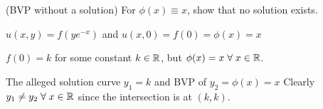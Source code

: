 (BVP without a solution) For $\phi(x) \equiv x$, show that no solution exists. 

\soln* 
$u(x, y) = f(ye^{-x})$ and $u(x, 0) = f(0) = \phi(x) = x$

\nl $f(0) = k$ for some constant $k \in \mathbb{R}$, but $\phi(x) = x \; \forall \; x \in \mathbb{R}$.

\nl The alleged solution curve $y_1 = k$ and BVP of $y_2 = \phi(x) = x$ Clearly $y_1 \neq y_2 \; \forall \; x \in \mathbb{R}$ since the intersection is at $(k, k)$.

